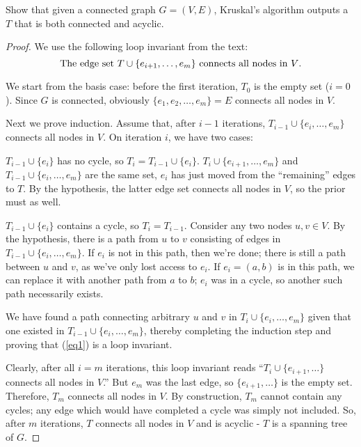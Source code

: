 \documentclass{article}
\newenvironment{prb}[1]
	{\renewcommand\theinner{#1}\inner}
	{\endinner}
\begin{document}
\begin{prb}{2.8}
	Show that given a connected graph $G=(V,E)$, Kruskal's algorithm outputs a
	$T$ that is both connected and acyclic.
\end{prb}

\begin{proof}
We use the following loop invariant from the text:
\begin{equation}\label{eq1}
\textit{\emph{The edge set $T\cup\{e_{i+1},\ldots,e_m\}$ connects all
nodes in $V$.}}
\end{equation}

We start from the basis case: before the first iteration, $T_0$ is
the empty set ($i=0$). Since $G$ is connected, obviously 
$\{e_1,e_2,\ldots,e_m\}=E$ connects all nodes in $V$.

Next we prove induction. Assume that, after $i-1$ iterations,
$T_{i-1}\cup\{e_i,\ldots,e_m\}$ connects all nodes in $V$. On iteration
$i$, we have two cases:

 $T_{i-1}\cup\{e_i\}$ has no cycle, so 
$T_i=T_{i-1}\cup\{e_i\}$. $T_i\cup\{e_{i+1},\ldots,e_m\}$ and 
$T_{i-1}\cup\{e_i,\ldots,e_m\}$ are the same set, $e_i$ has just
moved from the ``remaining'' edges to $T$. By the hypothesis, the 
latter edge set connects all nodes in $V$, so the prior must as well.

 $T_{i-1}\cup\{e_i\}$ contains a cycle, so
$T_i=T_{i-1}$. Consider any two nodes $u,v\in V$. By the hypothesis,
there is a path from $u$ to $v$ consisting of edges in 
$T_{i-1}\cup\{e_i,\ldots,e_m\}$. If $e_i$ is not in this path,
then we're done; there is still a path between $u$ and $v$, as 
we've only lost access to $e_i$. If $e_i=(a,b)$ is in this path, we
can replace it with another path from $a$ to $b$; $e_i$ was in a cycle,
so another such path necessarily exists. 

We have found a path connecting arbitrary $u$ and $v$ in 
$T_i\cup\{e_i,\ldots,e_m\}$ given that one existed in 
$T_{i-1}\cup\{e_i,\ldots,e_m\}$, thereby completing the induction step
and proving that (\ref{eq1}) is a loop invariant.

Clearly, after all $i=m$ iterations, this loop invariant reads
``$T_i\cup\{e_{i+1},\ldots\}$ connects all nodes in $V$.'' But
$e_m$ was the last edge, so $\{e_{i+1},\ldots\}$ is the empty set.
Therefore, $T_m$ connects all nodes in $V$. By construction, 
$T_m$ cannot contain any cycles; any edge which would
have completed a cycle was simply not included. So, after $m$ iterations,
$T$ connects all nodes in $V$ and is acyclic - 
$T$ is a spanning tree of $G$.\qedhere 
\end{proof}
\end{document}
